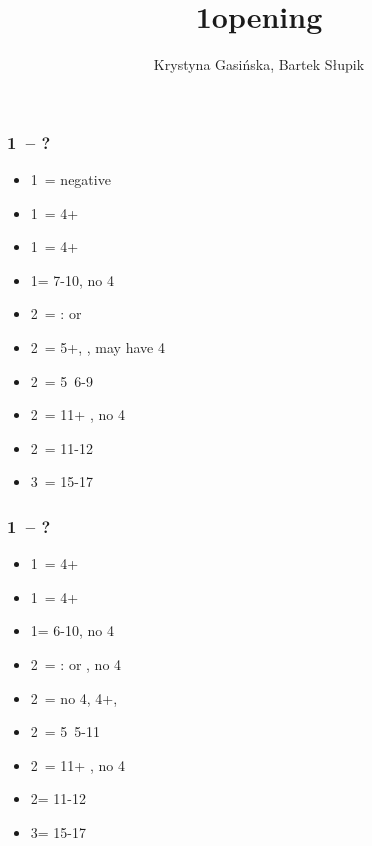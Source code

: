 \documentclass[12pt, a4paper]{article}
\title{1\minor opening}
\author{Krystyna Gasińska, Bartek Słupik}
\begin{document}
\maketitle


\subsubsection*{1\clubs\ -- ?}
\begin{itemize}
    \item 1\diams\ = negative
    \item 1\hearts\ = 4+\hearts
    \item 1\spades\ = 4+\spades
    \item 1\nt = 7-10, no 4\major
    \item 2\clubs\ = \gf: \bal or \clubs
    \item 2\diams\ = 5+\diams, \gf, may have 4\major
    \item 2\hearts\ = 5\hearts\ 6-9
    \item 2\spades\ = 11+ \bal, no 4\major
    \item 2\ntx\ = 11-12 \bal
    \item 3\nt\ = 15-17 \bal
\end{itemize}

\subsubsection*{1\diams\ -- ?}
\begin{itemize}
    \item 1\hearts\ = 4+\hearts
    \item 1\spades\ = 4+\spades
    \item 1\nt = 6-10, no 4\major
    \item 2\clubs\ = \gf: \bal or \clubs, no 4\major
    \item 2\diams\ = no 4\major, 4+\diams, \invp
    \item 2\hearts\ = 5\hearts\ 5-11
    \item 2\spades\ = 11+ \bal, no 4\major
    \item 2\nt = 11-12 \bal
    \item 3\nt = 15-17 \bal
\end{itemize}
\end{document}
